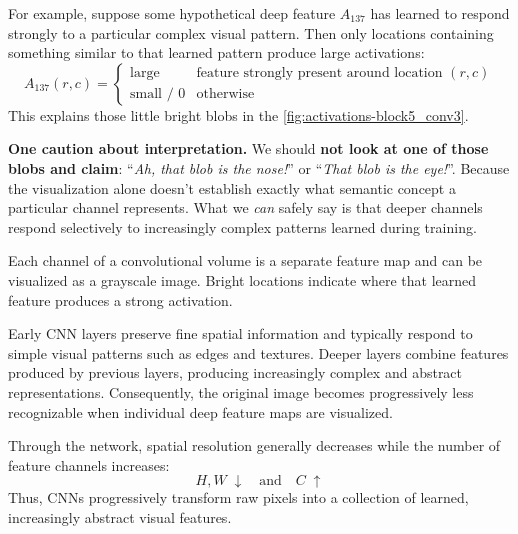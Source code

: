 \highspace
For example, suppose some hypothetical deep feature $A_{137}$ has learned to respond strongly to a particular complex visual pattern. Then only locations containing something similar to that learned pattern produce large activations:
\begin{equation*}
    A_{137}(r, c) = \begin{cases}
        \text{large}        & \text{feature strongly present around location } (r, c) \\
        \text{small / 0}    & \text{otherwise}
    \end{cases}
\end{equation*}
This explains those little bright blobs in the \autoref{fig:activations-block5_conv3}.

\highspace
\textcolor{Red2}{ \textbf{One caution about interpretation.}} We should \textbf{not look at one of those blobs and claim}: ``\emph{Ah, that blob is the nose!}'' or ``\emph{That blob is the eye!}''. Because the visualization alone doesn't establish exactly what semantic concept a particular channel represents. What we \emph{can} safely say is that deeper channels respond selectively to increasingly complex patterns learned during training.

\highspace
\begin{takeawaysbox}
    Each channel of a convolutional volume is a separate feature map and can be visualized as a grayscale image. Bright locations indicate where that learned feature produces a strong activation.

    \highspace
    Early CNN layers preserve fine spatial information and typically respond to simple visual patterns such as edges and textures. Deeper layers combine features produced by previous layers, producing increasingly complex and abstract representations. Consequently, the original image becomes progressively less recognizable when individual deep feature maps are visualized.

    \highspace
    Through the network, spatial resolution generally decreases while the number of feature channels increases:
    \begin{equation*}
        H, W \; \downarrow \quad \text{and} \quad C \; \uparrow
    \end{equation*}
    Thus, CNNs progressively transform raw pixels into a collection of learned, increasingly abstract visual features.
\end{takeawaysbox}

